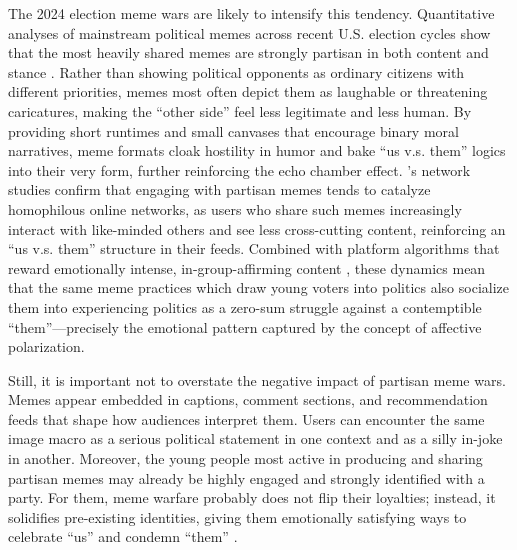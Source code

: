 \documentclass[12pt,twoside]{article}
\begin{document}
The 2024 election meme wars are likely to intensify this tendency. Quantitative analyses of mainstream political memes across recent U.S. election cycles show that the most heavily shared memes are strongly partisan in both content and stance \parencite{collier2024compositionmainstreammemes}.  Rather than showing political opponents as ordinary citizens with different priorities, memes most often depict them as laughable or threatening caricatures, making the ``other side'' feel less legitimate and less human. By providing short runtimes and small canvases that encourage binary moral narratives, meme formats cloak hostility in humor and bake ``us v.s. them'' logics into their very form, further reinforcing the echo chamber effect. \textcite{kim2023partisanmemes}'s network studies confirm that engaging with partisan memes tends to catalyze homophilous online networks, as users who share such memes increasingly interact with like-minded others and see less cross-cutting content, reinforcing an ``us v.s. them'' structure in their feeds. Combined with platform algorithms that reward emotionally intense, in-group-affirming content \parencite{ye2025auditingexposurebias}, these dynamics mean that the same meme practices which draw young voters into politics also socialize them into experiencing politics as a zero-sum struggle against a contemptible ``them''---precisely the emotional pattern captured by the concept of affective polarization.


Still, it is important not to overstate the negative impact of partisan meme wars. Memes appear embedded in captions, comment sections, and recommendation feeds that shape how audiences interpret them. Users can encounter the same image macro as a serious political statement in one context and as a silly in-joke in another. Moreover, the young people most active in producing and sharing partisan memes may already be highly engaged and strongly identified with a party. For them, meme warfare probably does not flip their loyalties; instead, it solidifies pre-existing identities, giving them emotionally satisfying ways to celebrate ``us'' and condemn ``them'' \parencite{galipeau2023impactpoliticalmemes}.
\end{document}
